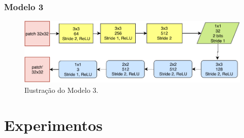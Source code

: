 \documentclass{beamer}
\begin{document}
\begin{frame}
\frametitle{Modelo 3}
\begin{figure}
\includegraphics[width=\textwidth]{figs/toderici_model.pdf}
\caption{Ilustração do Modelo 3.}
\end{figure}
\end{frame}
\section{Experimentos}
\end{document}
